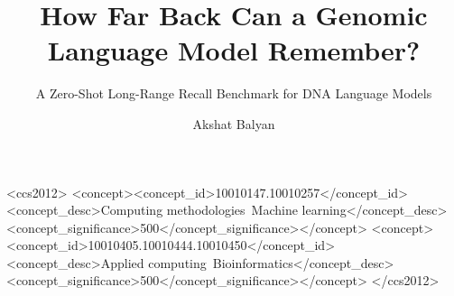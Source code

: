 \documentclass[sigconf,nonacm]{acmart}
\begin{document}
\title{How Far Back Can a Genomic Language Model Remember?}
\subtitle{A Zero-Shot Long-Range Recall Benchmark for DNA Language Models}

\author{Akshat Balyan}

\begin{abstract}

\end{abstract}

\begin{CCSXML}
<ccs2012>
<concept><concept_id>10010147.10010257</concept_id><concept_desc>Computing methodologies~Machine learning</concept_desc><concept_significance>500</concept_significance></concept>
<concept><concept_id>10010405.10010444.10010450</concept_id><concept_desc>Applied computing~Bioinformatics</concept_desc><concept_significance>500</concept_significance></concept>
</ccs2012>
\end{CCSXML}

\maketitle





\end{document}
